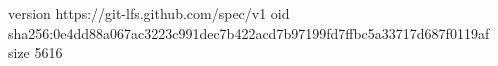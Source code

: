 version https://git-lfs.github.com/spec/v1
oid sha256:0e4dd88a067ac3223c991dec7b422acd7b97199fd7ffbc5a33717d687f0119af
size 5616
